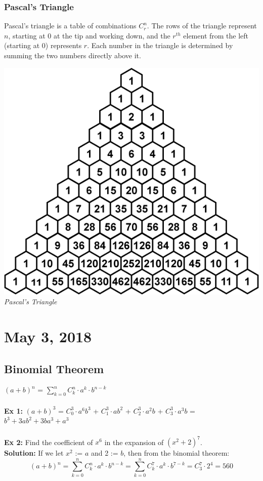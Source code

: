 \documentclass{article}
\begin{document}
\subsubsection{Pascal's Triangle}
Pascal's triangle is a table of combinations $C_{r}^{n}$. The rows of the triangle represent $n$, starting at 0 at the tip and working down, and the $r^{th}$ element from the left (starting at 0) represents $r$. Each number in the triangle is determined by summing the two numbers directly above it.\\
\begin{center}
\includegraphics[scale=0.5]{pascal.png}\\
\textit{Pascal's Triangle}
\end{center}
\newpage


\section{May 3, 2018}
\subsection{Binomial Theorem}
$(a+b)^{n}$ = $\sum_{k=0}^{n} C_{k}^{n} \cdot a^{k} \cdot b^{n-k}$\\\\
\textbf{Ex 1:} $(a+b)^{3}$ = $C_{0}^{3} \cdot a^{6}b^{3}$ + $C_{1}^{3} \cdot ab^{2}$ + $C_{2}^{3} \cdot a^{2}b$ + $C_{3}^{3} \cdot a^{3}b$ = $b^{3} + 3ab^{2} + 3ba^{3} + a^{3}$\\\\
\textbf{Ex 2:} Find the coefficient of $x^{6}$ in the expansion of $(x^{2}+2)^{7}$.\\
\textbf{Solution:} If we let $x^{2}$ := $a$ and 2 := $b$, then from the binomial theorem:
\[(a+b)^{n} = \sum_{k=0}^{n} C_{k}^{n} \cdot a^{k} \cdot b^{n-k} = \sum_{k=0}^{n} C_{k}^{7} \cdot a^{k} \cdot b^{7-k} = C_{3}^{7} \cdot 2^{4} = 560\]
\end{document}
